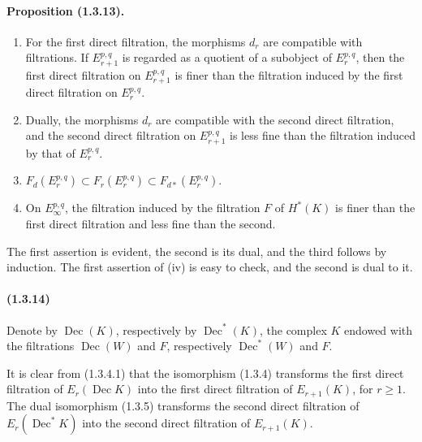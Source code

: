 \documentclass[10pt]{article}
\newcommand{\Dec}{\operatorname{Dec}}
\begin{document}
\paragraph{Proposition (1.3.13).}
\begin{enumerate}[label=(\roman*)]
\item For the first direct filtration, the morphisms $d_r$ are compatible with filtrations. If $E_{r+1}^{p,q}$ is regarded as a quotient of a subobject of $E_r^{p,q}$, then the first direct filtration on $E_{r+1}^{p,q}$ is finer than the filtration induced by the first direct filtration on $E_r^{p,q}$.
\item Dually, the morphisms $d_r$ are compatible with the second direct filtration, and the second direct filtration on $E_{r+1}^{p,q}$ is less fine than the filtration induced by that of $E_r^{p,q}$.
\item $F_d(E_r^{p,q})\subset F_r(E_r^{p,q})\subset F_{d*}(E_r^{p,q})$.
\item On $E_\infty^{p,q}$, the filtration induced by the filtration $F$ of $H^*(K)$ is finer than the first direct filtration and less fine than the second.
\end{enumerate}
The first assertion is evident, the second is its dual, and the third follows by induction. The first assertion of (iv) is easy to check, and the second is dual to it.

\paragraph{(1.3.14)} Denote by $\Dec(K)$, respectively by $\Dec^*(K)$, the complex $K$ endowed with the filtrations $\Dec(W)$ and $F$, respectively $\Dec^*(W)$ and $F$.

It is clear from (1.3.4.1) that the isomorphism (1.3.4) transforms the first direct filtration of $E_r(\Dec K)$ into the first direct filtration of $E_{r+1}(K)$, for $r\ge1$. The dual isomorphism (1.3.5) transforms the second direct filtration of $E_r(\Dec^*K)$ into the second direct filtration of $E_{r+1}(K)$.
\end{document}
